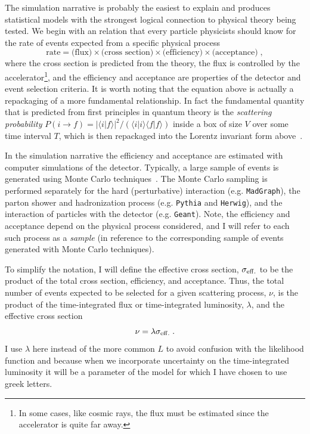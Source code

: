 \documentclass{cernrep}
\begin{document}
The simulation narrative is probably the easiest to explain and produces statistical models with the strongest logical connection to physical theory being tested.  We begin with an relation that every particle physicists should know for the rate of events expected from a specific physical process
\begin{equation}
\textrm{rate} = \textrm{(flux)} \times \textrm{(cross section)}  \times\textrm{(efficiency)}  \times \textrm{(acceptance)} \;,
\end{equation}
where the cross section is predicted from the theory, the flux is controlled by the accelerator\footnote{In some cases, like cosmic rays, the flux must be estimated since the accelerator is quite far away.}, and the efficiency and acceptance are properties of the detector and event selection criteria.  It is worth noting that the equation above is actually a repackaging of a more fundamental relationship. In fact the fundamental quantity that is predicted from first principles in quantum theory is the  \textit{scattering probability}  \mbox{$P(i\to f)=|\langle i|f\rangle|^2/ (\langle i|i\rangle\langle f | f \rangle)$} inside a box of size $V$ over some time interval $T$, which is then repackaged into the Lorentz invariant form above~\cite{Sredniki}.

In the simulation narrative the efficiency and acceptance are estimated with computer simulations of the detector.  Typically, a large sample of events is generated using Monte Carlo techniques~\cite{MonteCarlo}.  The Monte Carlo sampling is performed separately  for the hard (perturbative) interaction (e.g. \texttt{MadGraph}), the parton shower and hadronization process (e.g. \texttt{Pythia} and \texttt{Herwig}), and the interaction of particles with the detector (e.g. \texttt{Geant}).  Note, the efficiency and acceptance depend on the physical process considered, and I will refer to each such process as a \textit{sample} (in reference to the corresponding sample of events generated with Monte Carlo techniques).

To simplify the notation, I will define the effective cross section, $\sigma_{\rm eff.}$ to be the product of the total cross section, efficiency, and acceptance.  Thus, the total number of events expected to be selected for a given scattering process, $\nu$, is the product of the time-integrated flux or time-integrated luminosity, $\lambda$, and the effective cross section
\begin{equation}
\nu = \lambda \sigma_{\rm eff.}\;.
\end{equation}
I use $\lambda$ here instead of the more common $L$ to avoid confusion with the likelihood function and because when we incorporate uncertainty on the time-integrated luminosity it will be a parameter of the model for which I have chosen to use greek letters.  
\end{document}
